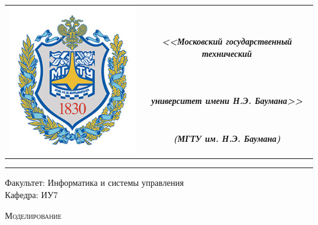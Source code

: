 \begin{titlepage}

    \begin{table}[H]
        \centering
        \begin{tabular}{cc}
            \multirow{4}{*}{\includegraphics[scale=0.3]{../bmstu.jpg}}
            & \\
            & \large \textit{\textbf{<<Московский государственный технический}} \\
            & \large \textit{\textbf{университет имени Н.Э. Баумана>>}}\\
            & \large \textit{\textbf{(МГТУ им. Н.Э. Баумана)}}\\
        \end{tabular}
    \end{table}

    \begin{flushleft}
        \rule{\textwidth}{3pt}
    \end{flushleft}

    \begin{flushleft}
        \Large
        Факультет: Информатика и системы управления \\
        Кафедра: ИУ7
    \end{flushleft}

    \vspace{2cm}

    \begin{center}
        \LARGE
        \textsc{Моделирование}
    \end{center}

    \vspace{3cm}

    \begin{center}
        \large


\end{center}
\end{titlepage}
